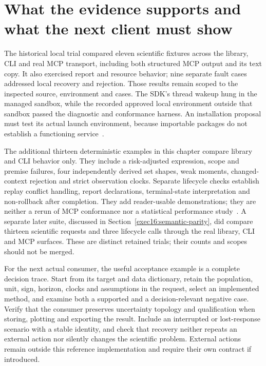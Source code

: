 \section{What the evidence supports and what the next client must show}

The historical local trial compared eleven scientific fixtures across the
library, CLI and real MCP transport, including both structured MCP output
and its text copy. It also exercised report and resource behavior; nine
separate fault cases addressed local recovery and rejection. Those results
remain scoped to the inspected source, environment and cases. The SDK's
thread wakeup hung in the managed sandbox, while the recorded approved local
environment outside that sandbox passed the diagnostic and conformance
harness. An installation proposal must test its actual launch environment,
because importable packages do not establish a functioning service~\citep{v12_in_runtime}.

The additional thirteen deterministic examples in this chapter compare
library and CLI behavior only. They include a risk-adjusted expression,
scope and premise failures, four independently derived set shapes, weak
moments, changed-context rejection and strict observation clocks. Separate
lifecycle checks establish replay conflict handling, report declarations,
terminal-state interpretation and non-rollback after completion. They add
reader-usable demonstrations; they are neither a rerun of MCP conformance
nor a statistical performance study~\citep{exec13_i2_examples}. A separate later suite, discussed in Section~\ref{exec16:semantic-parity}, did compare thirteen scientific requests and three lifecycle calls through the real library, CLI and MCP surfaces. These are distinct retained trials; their counts and scopes should not be merged.

For the next actual consumer, the useful acceptance example is a complete
decision trace. Start from its target and data dictionary, retain the
population, unit, sign, horizon, clocks and assumptions in the request,
select an implemented method, and examine both a supported and a
decision-relevant negative case. Verify that the consumer preserves
uncertainty topology and qualification when storing, plotting and exporting
the result. Include an interrupted or lost-response scenario with a stable
identity, and check that recovery neither repeats an external action nor
silently changes the scientific problem. External actions remain outside
this reference implementation and require their own contract if introduced.

